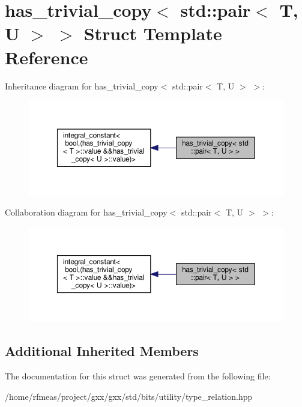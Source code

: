 \hypertarget{structhas__trivial__copy_3_01std_1_1pair_3_01T_00_01U_01_4_01_4}{}\section{has\+\_\+trivial\+\_\+copy$<$ std\+:\+:pair$<$ T, U $>$ $>$ Struct Template Reference}
\label{structhas__trivial__copy_3_01std_1_1pair_3_01T_00_01U_01_4_01_4}


Inheritance diagram for has\+\_\+trivial\+\_\+copy$<$ std\+:\+:pair$<$ T, U $>$ $>$\+:
\nopagebreak
\begin{figure}[H]
\begin{center}
\leavevmode
\includegraphics[width=350pt]{structhas__trivial__copy_3_01std_1_1pair_3_01T_00_01U_01_4_01_4__inherit__graph}
\end{center}
\end{figure}


Collaboration diagram for has\+\_\+trivial\+\_\+copy$<$ std\+:\+:pair$<$ T, U $>$ $>$\+:
\nopagebreak
\begin{figure}[H]
\begin{center}
\leavevmode
\includegraphics[width=350pt]{structhas__trivial__copy_3_01std_1_1pair_3_01T_00_01U_01_4_01_4__coll__graph}
\end{center}
\end{figure}
\subsection*{Additional Inherited Members}


The documentation for this struct was generated from the following file\+:\begin{DoxyCompactItemize}
\item 
/home/rfmeas/project/gxx/gxx/std/bits/utility/type\+\_\+relation.\+hpp\end{DoxyCompactItemize}
